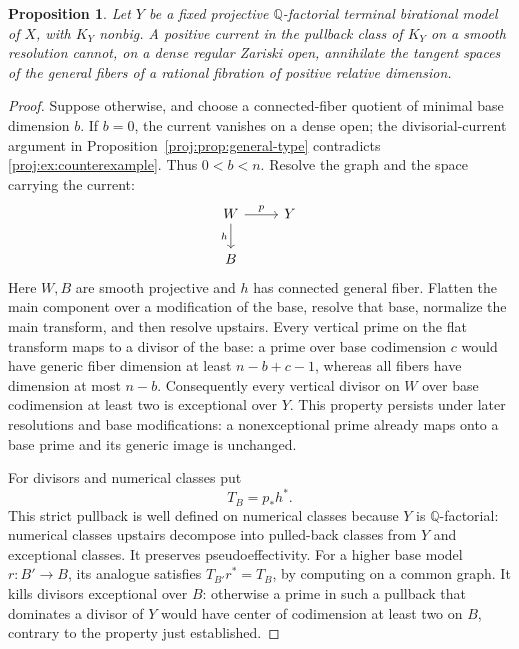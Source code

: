 \documentclass[11pt,letterpaper]{article}
\newcommand{\Q}{\mathbb{Q}}
\newtheorem{proposition}[theorem]{Proposition}
\theoremstyle{definition}
\theoremstyle{remark}
\begin{document}
\begin{proposition}\label{proj:prop:no-pullback}
Let \(Y\) be a fixed projective \(\Q\)-factorial terminal
birational model of \(X\), with \(K_Y\) nonbig. A positive current
in the pullback class of \(K_Y\) on a smooth resolution cannot,
on a dense regular Zariski open, annihilate the tangent spaces
of the general fibers of a rational fibration of positive
relative dimension.
\end{proposition}
\begin{proof}
Suppose otherwise, and choose a connected-fiber quotient of
minimal base dimension \(b\). If \(b=0\), the current vanishes on
a dense open; the divisorial-current argument in
Proposition~\ref{proj:prop:general-type} contradicts
\eqref{proj:ex:counterexample}. Thus \(0<b<n\).
Resolve the graph and the space carrying the current:
\[
 \begin{tikzcd}
 W \arrow[r,"p"] \arrow[d,"h"'] & Y \\
 B &
 \end{tikzcd}
\]
Here \(W,B\) are smooth projective and \(h\) has connected
general fiber. Flatten the main component over a modification of
the base, resolve that base, normalize the main transform, and
then resolve upstairs. Every vertical prime on the flat
transform maps to a divisor of the base: a prime over base
codimension \(c\) would have generic fiber dimension at least
\(n-b+c-1\), whereas all fibers have dimension at most \(n-b\).
Consequently every vertical divisor
on \(W\) over base codimension at least two is exceptional over
\(Y\). This property persists under later resolutions and base
modifications: a nonexceptional prime already maps onto a base
prime and its generic image is unchanged.

For divisors and numerical classes put
\[
 T_B=p_*h^*.
\]
This strict pullback is well defined on numerical classes because
\(Y\) is \(\Q\)-factorial: numerical classes upstairs decompose
into pulled-back classes from \(Y\) and exceptional classes.
It preserves pseudoeffectivity. For a higher base model
\(r:B'\to B\), its analogue satisfies
\(T_{B'}r^*=T_B\), by computing on a common graph.
It kills divisors exceptional over \(B\): otherwise a prime
in such a pullback that dominates a divisor of \(Y\) would
have center of codimension at least two on \(B\), contrary
to the property just established.


\end{proof}
\end{document}
